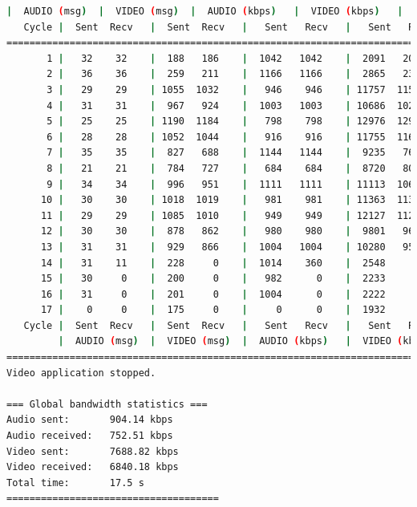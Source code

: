 \begin{lstlisting}[language=bash,basicstyle=\ttfamily\tiny]
         |  AUDIO (msg)  |  VIDEO (msg)  |  AUDIO (kbps)   |  VIDEO (kbps)   |     CPU (%) 
   Cycle |  Sent  Recv   |  Sent  Recv   |   Sent   Recv   |   Sent   Recv   | Program System
================================================================================================
       1 |   32    32    |  188   186    |  1042   1042    |  2091   2071    |  26      0       
       2 |   36    36    |  259   211    |  1166   1166    |  2865   2331    |  34     70       
       3 |   29    29    | 1055  1032    |   946    946    | 11757  11503    |  34     72       
       4 |   31    31    |  967   924    |  1003   1003    | 10686  10212    |  30     71       
       5 |   25    25    | 1190  1184    |   798    798    | 12976  12907    |  35     77       
       6 |   28    28    | 1052  1044    |   916    916    | 11755  11666    |  34     71       
       7 |   35    35    |  827   688    |  1144   1144    |  9235   7681    |  38     71       
       8 |   21    21    |  784   727    |   684    684    |  8720   8087    |  14     78       
       9 |   34    34    |  996   951    |  1111   1111    | 11113  10607    |  43     69       
      10 |   30    30    | 1018  1019    |   981    981    | 11363  11377    |  31     71       
      11 |   29    29    | 1085  1010    |   949    949    | 12127  11288    |  36     73       
      12 |   30    30    |  878   862    |   980    980    |  9801   9620    |  24     73       
      13 |   31    31    |  929   866    |  1004   1004    | 10280   9584    |  32     74       
      14 |   31    11    |  228     0    |  1014    360    |  2548      0    |  42     65       
      15 |   30     0    |  200     0    |   982      0    |  2233      0    |  45     63       
      16 |   31     0    |  201     0    |  1004      0    |  2222      0    |  45     67       
      17 |    0     0    |  175     0    |     0      0    |  1932      0    |   2     12       
   Cycle |  Sent  Recv   |  Sent  Recv   |   Sent   Recv   |   Sent   Recv   | Program System
         |  AUDIO (msg)  |  VIDEO (msg)  |  AUDIO (kbps)   |  VIDEO (kbps)   |     CPU (%) 
===========================================================================================
Video application stopped.

=== Global bandwidth statistics ===
Audio sent:       904.14 kbps
Audio received:   752.51 kbps
Video sent:       7688.82 kbps
Video received:   6840.18 kbps
Total time:       17.5 s
=====================================


\end{lstlisting}
